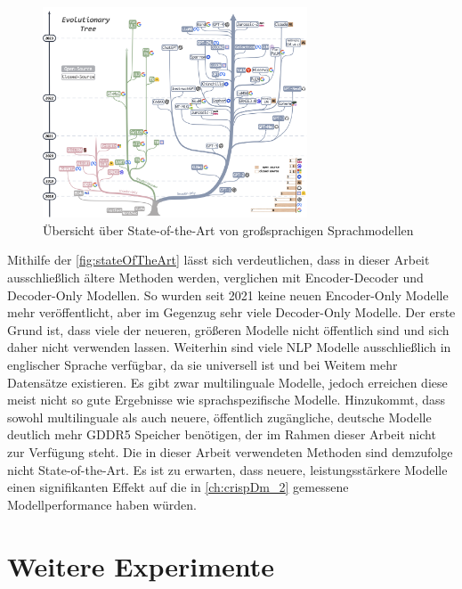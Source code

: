 
\begin{figure}[H]
  \centering
  \includegraphics[width=0.7\textwidth]{data/images/tree.png}
  \caption{Übersicht über State-of-the-Art von großsprachigen Sprachmodellen \autocite{yang_harnessing_2023}} \label{fig:stateOfTheArt}
\end{figure}

Mithilfe der \autoref{fig:stateOfTheArt} lässt sich verdeutlichen, dass in dieser Arbeit ausschließlich ältere Methoden werden, verglichen mit Encoder-Decoder und Decoder-Only Modellen. So wurden seit \num{2021} keine neuen Encoder-Only Modelle mehr veröffentlicht, aber im Gegenzug sehr viele Decoder-Only Modelle. Der erste Grund ist, dass viele der neueren, größeren Modelle nicht öffentlich sind und sich daher nicht verwenden lassen. Weiterhin sind viele \ac{NLP} Modelle ausschließlich in englischer Sprache verfügbar, da sie universell ist und bei Weitem mehr Datensätze existieren. Es gibt zwar multilinguale Modelle, jedoch erreichen diese meist nicht so gute Ergebnisse wie sprachspezifische Modelle. Hinzukommt, dass sowohl multilinguale als auch neuere, öffentlich zugängliche, deutsche Modelle deutlich mehr \ac{GDDR5} Speicher benötigen, der im Rahmen dieser Arbeit nicht zur Verfügung steht. Die in dieser Arbeit verwendeten Methoden sind demzufolge nicht State-of-the-Art. Es ist zu erwarten, dass neuere, leistungsstärkere Modelle einen signifikanten Effekt auf die in \autoref{ch:crispDm_2} gemessene Modellperformance haben würden.

\section{Weitere Experimente} \label{subsec:furtherExperiments}

